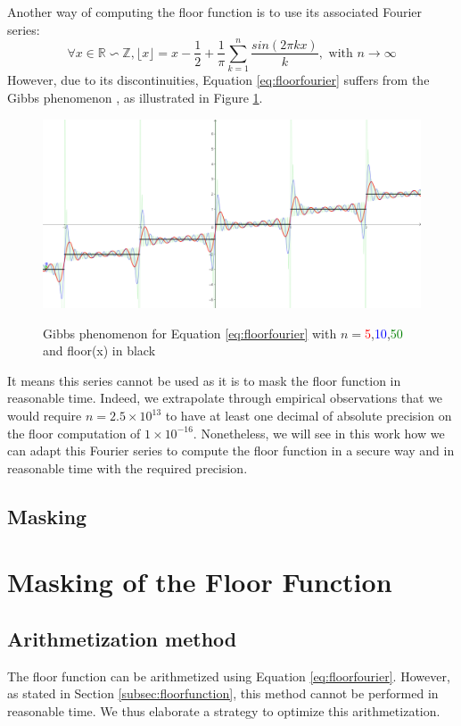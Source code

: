 \documentclass[runningheads]{llncs}
\begin{document}
\medskip

\noindent Another way of computing the floor function is to use its associated Fourier series:\begin{equation}\label{eq:floorfourier}
  \forall x \in \mathbb{R}\backsim \mathbb{Z}, \lfloor x\rfloor = x - \frac{1}{2} + \frac{1}{\pi}\sum_{k=1}^n \frac{sin(2\pi kx)}{k},\text{ with }n\rightarrow \infty
\end{equation}
However, due to its discontinuities, Equation \ref{eq:floorfourier} suffers from the Gibbs phenomenon \cite{8e44e918-40ae-3857-bb25-dc12ccf9e7c3}, as illustrated in Figure \ref{fig:gibbs}. 
\begin{figure}[!h]
  \includegraphics[width=\textwidth]{figure/gibbsphenomenon.png}
  \label{fig:gibbs}
  \caption{Gibbs phenomenon for Equation \ref{eq:floorfourier} with $n=$\textcolor{red}{5},\textcolor{blue}{10},\textcolor{green}{50} and floor(x) in black}
\end{figure}
It means this series cannot be used as it is to mask the floor function in reasonable time. Indeed, we extrapolate through empirical observations that we would require $n=\num{2.5}\times 10^{13}$ to have at least one decimal of absolute precision on the floor computation of $1\times 10^{-16}$. Nonetheless, we will see in this work how we can adapt this Fourier series to compute the floor function in a secure way and in reasonable time with the required precision.
\subsection{Masking}

\section{Masking of the Floor Function}\label{sec:maskfloor}
\subsection{Arithmetization method}
The floor function can be arithmetized using Equation \ref{eq:floorfourier}. However, as stated in Section \ref{subsec:floorfunction}, this method cannot be performed in reasonable time. We thus elaborate a strategy to optimize this arithmetization.
\end{document}
